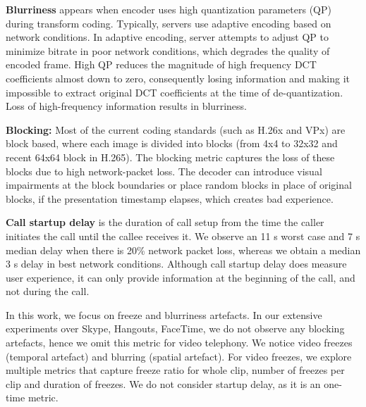 \noindent \textbf{Blurriness} appears when encoder uses high quantization parameters (QP) during transform coding. Typically, servers use adaptive encoding based on network conditions. In adaptive encoding, server attempts to adjust QP to minimize bitrate in poor network conditions, which degrades the quality of encoded frame. High QP reduces the magnitude of high frequency DCT coefficients almost down to zero, consequently losing information and making it impossible to extract original DCT coefficients at the time of de-quantization.  Loss of high-frequency information results in blurriness. 

\noindent \textbf{Blocking:} Most of the current coding standards (such as H.26x and VPx) are block based, where each image is divided into blocks (from 4x4 to 32x32 and recent 64x64 block in H.265). The blocking metric captures the loss of these blocks due to high network-packet loss. The decoder can introduce visual impairments at the block boundaries or place random blocks in place of original blocks, if the presentation timestamp elapses, which creates bad experience. 

\noindent \textbf{Call startup delay} is the duration of call setup from the time the caller initiates the call until the callee receives it. 
We observe an 11 s worst case and 7 s median delay when there is 20\% network packet loss, whereas we obtain a median 3 s delay in best network conditions.
Although call startup delay does measure user experience, it can only provide information at the beginning of the call, and not during the call.

In this work, we focus on freeze and blurriness artefacts. In our extensive experiments over Skype, Hangouts, FaceTime, we do not observe any blocking artefacts, hence we omit this metric for video telephony. We notice video freezes (temporal artefact) and blurring (spatial artefact). For video freezes, we  explore multiple metrics that capture freeze ratio for whole clip, number of freezes per clip and duration of freezes. We do not consider startup delay, as it is an one-time metric.
